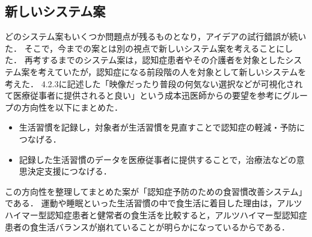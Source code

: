 \documentclass[../report]{subfiles}
\begin{document}
\subsection{新しいシステム案}
どのシステム案もいくつか問題点が残るものとなり，アイデアの試行錯誤が続いた．
そこで，今までの案とは別の視点で新しいシステム案を考えることにした．
再考するまでのシステム案は，認知症患者やその介護者を対象としたシステム案を考えていたが，認知症になる前段階の人を対象として新しいシステムを考えた．
4.2.3に記述した「映像だったり普段の何気ない選択などが可視化されて医療従事者に提供されると良い」という成本迅医師からの要望を参考にグループの方向性を以下にまとめた．

\begin{itemize}
    \item 生活習慣を記録し，対象者が生活習慣を見直すことで認知症の軽減・予防につなげる．
    \item 記録した生活習慣のデータを医療従事者に提供することで，治療法などの意思決定支援につなげる．
\end{itemize}

この方向性を整理してまとめた案が「認知症予防のための食習慣改善システム」である．
運動や睡眠といった生活習慣の中で食生活に着目した理由は，アルツハイマー型認知症患者と健常者の食生活を比較すると，アルツハイマー型認知症患者の食生活バランスが崩れている\cite{dementia-nutrition}ことが明らかになっているからである．
\end{document}
